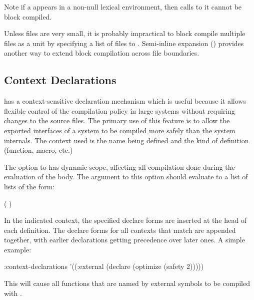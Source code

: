 Note if a  appears in a non-null lexical environment, then
calls to it cannot be block compiled.

Unless files are very small, it is probably impractical to block compile
multiple files as a unit by specifying a list of files to .
Semi-inline expansion () provides another way to
extend block compilation across file boundaries.


\subsection{Context Declarations}
\label{context-declarations}

\cmucl{} has a context-sensitive declaration mechanism which is useful
because it allows flexible control of the compilation policy in large
systems without requiring changes to the source files.  The primary
use of this feature is to allow the exported interfaces of a system to
be compiled more safely than the system internals.  The context used
is the name being defined and the kind of definition (function, macro,
etc.)

The  option to  has
dynamic scope, affecting all compilation done during the evaluation of the
body.  The argument to this option should evaluate to a list of lists of the
form:
\begin{example}
( )
\end{example}
In the indicated context, the specified declare forms are inserted at
the head of each definition.  The declare forms for all contexts that
match are appended together, with earlier declarations getting
precedence over later ones.  A simple example:
\begin{example}
    :context-declarations
    '((:external (declare (optimize (safety 2)))))
\end{example}
This will cause all functions that are named by external symbols to be
compiled with .

